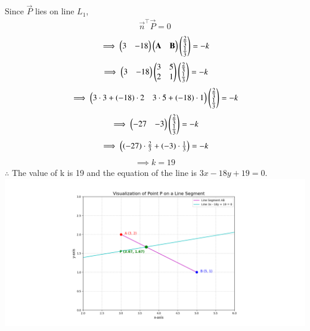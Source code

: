 \documentclass[journal]{IEEEtran}
\begin{document}
Since $\vec{P}$ lies on line $L_1$,
\begin{align}
    \vec{n}^{\top}\vec{P}=0
\end{align}
\begin{align}
    \implies \begin{pmatrix}3 &-18\end{pmatrix}\begin{pmatrix}\mathbf{A} & \mathbf{B}\end{pmatrix}\begin{pmatrix}\frac{2}{3}\\\frac{1}{3}\end{pmatrix}=-k
\end{align}
\begin{align}
    \implies \begin{pmatrix}3 & -18\end{pmatrix}\begin{pmatrix}3 & 5\\2 & 1\end{pmatrix}\begin{pmatrix}\frac{2}{3}\\\frac{1}{3}\end{pmatrix}=-k
\end{align}
\begin{align}
    \implies \begin{pmatrix}3\cdot 3 + (-18)\cdot 2 & 3\cdot 5 + (-18)\cdot 1\end{pmatrix}\begin{pmatrix}\frac{2}{3}\\\frac{1}{3}\end{pmatrix}=-k
\end{align}
\begin{align}
    \implies \begin{pmatrix}-27&-3\end{pmatrix}\begin{pmatrix}\frac{2}{3}\\\frac{1}{3}\end{pmatrix}=-k
\end{align}
\begin{align}
    \implies \begin{pmatrix}(-27)\cdot \frac{2}{3} + (-3)\cdot \frac{1}{3}\end{pmatrix}=-k
\end{align}
\begin{align}
    \implies k=19
\end{align}
$\therefore$ The value of k is 19 and the equation of the line is $3x - 18y+19=0$.
\centering   \includegraphics[width=\columnwidth, height=1\textheight, keepaspectratio]{figs/fig1.png} 
\end{document}
